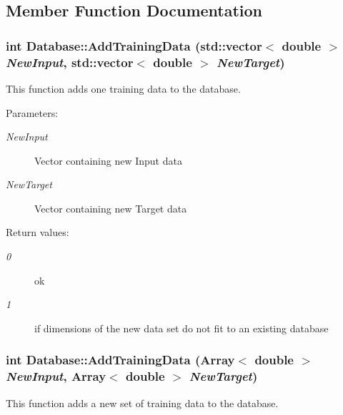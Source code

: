 \subsection{Member Function Documentation}
\subsubsection{\setlength{\rightskip}{0pt plus 5cm}int Database::Add\-Training\-Data (std::vector$<$ double $>$ {\em New\-Input}, std::vector$<$ double $>$ {\em New\-Target})}\label{classDatabase_a2}


This function adds one training data to the database.

\begin{Desc}
\item[Parameters: ]\par
\begin{description}
\item[{\em 
New\-Input}]Vector containing new Input data \item[{\em 
New\-Target}]Vector containing new Target data \end{description}
\end{Desc}
\begin{Desc}
\item[Return values: ]\par
\begin{description}
\item[{\em 
0}]ok \item[{\em 
1}]if dimensions of the new data set do not fit to an existing database \end{description}
\end{Desc}
\subsubsection{\setlength{\rightskip}{0pt plus 5cm}int Database::Add\-Training\-Data (Array$<$ double $>$ {\em New\-Input}, Array$<$ double $>$ {\em New\-Target})}\label{classDatabase_a1}


This function adds a new set of training data to the database.

